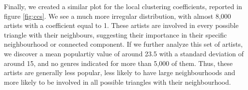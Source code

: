 Finally, we created a similar plot for the local clustering coefficients, reported in figure \ref{fig:ccs}. We see a much more irregular distribution, with almost 8,000 artists with a coefficient equal to 1. These artists are involved in every possible triangle with their neighbours, suggesting their importance in their specific neighbourhood or connected component. If we further analyze this set of artists, we discover a mean populartiy value of around 23.5 with a standard deviation of around 15, and no genres indicated for more than 5,000 of them. Thus, these artists are generally less popular, less likely to have large neighbourhoods and more likely to be involved in all possible triangles with their neighbourhood.